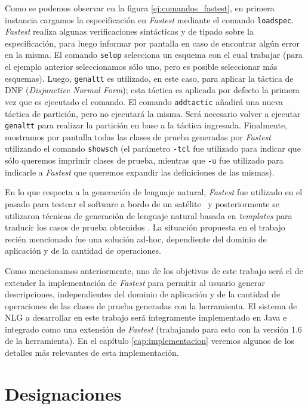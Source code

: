 Como se podemos observar en la figura \ref{ej:comandos_fastest}, en primera instancia cargamos la especificación en \emph{Fastest} mediante el comando \texttt{loadspec}. \emph{Fastest} realiza algunas verificaciones sintácticas y de tipado sobre la especificación, para luego informar por pantalla en caso de encontrar algún error en la misma. El comando \texttt{selop} selecciona un esquema con el cual trabajar (para el ejemplo anterior seleccionamos sólo uno, pero es posible seleccionar más esquemas). Luego, \texttt{genaltt} es utilizado, en este caso, para aplicar la táctica de DNF (\emph{Disjunctive Normal Form}); esta táctica es aplicada por defecto la primera vez que es ejecutado el comando. El comando \texttt{addtactic} añadirá una nueva táctica de partición, pero no ejecutará la misma. Será necesario volver a ejecutar \texttt{genaltt} para realizar la partición en base a la táctica ingresada. Finalmente, mostramos por pantalla todas las clases de prueba generadas por \emph{Fastest} utilizando el comando \texttt{showsch} (el parámetro \texttt{-tcl} fue utilizado para indicar que sólo queremos imprimir clases de prueba, mientras que \texttt{-u} fue utilizado para indicarle a \emph{Fastest} que queremos expandir las definiciones de las mismas).

En lo que respecta a la generación de lenguaje natural, \emph{Fastest} fue utilizado en el pasado para testear el software a bordo de un satélite~\cite{satelite} y posteriormente se utilizaron técnicas de generación de lenguaje natural basada en \textit{templates} para traducir los casos de prueba obtenidos \cite{cristia_pluss}. La situación propuesta en el trabajo recién mencionado fue una solución ad-hoc, dependiente del dominio de aplicación y de la cantidad de operaciones.


Como mencionamos anteriormente, uno de los objetivos de este trabajo será el de extender la implementación de \emph{Fastest} para permitir al usuario generar descripciones, independientes del dominio de aplicación y de la cantidad de operaciones de las clases de prueba generadas con la herramienta.
El sistema de NLG a desarrollar en este trabajo será íntegramente implementado en Java e integrado como una extensión de \emph{Fastest} (trabajando para esto con la versión 1.6 de la herramienta). En el capítulo \ref{cap:implementacion} veremos algunos de los detalles más relevantes de esta implementación.

\section{Designaciones}
\label{cap:designaciones}

